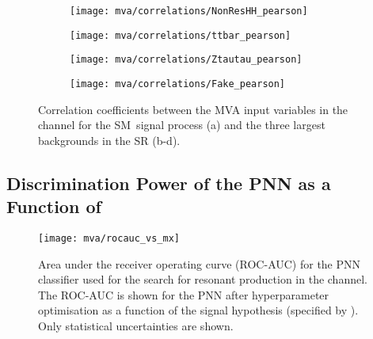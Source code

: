 \begin{figure}[htbp]
  \centering

  \begin{subfigure}[t]{.49\textwidth}
    \texttt{[image: mva/correlations/NonResHH\_pearson]}
  \end{subfigure}\hfill %
  \begin{subfigure}[t]{.49\textwidth}
    \texttt{[image: mva/correlations/ttbar\_pearson]}
  \end{subfigure}

  \begin{subfigure}[t]{.49\textwidth}
    \texttt{[image: mva/correlations/Ztautau\_pearson]}
  \end{subfigure}\hfill %
  \begin{subfigure}[t]{.49\textwidth}
    \texttt{[image: mva/correlations/Fake\_pearson]}
  \end{subfigure}

  \caption[Correlation coefficients between the MVA input variables in the
  \hadhad channel.]{Correlation coefficients between the MVA input variables in
    the \hadhad channel for the SM~\HH signal process (a) and the three largest
    backgrounds in the \hadhad SR (b-d).}%
  \label{fig:mva_input_correlations}
\end{figure}


\clearpage
\subsection{Discrimination Power of the PNN as a Function of \mX}%
\label{app:pnn_rocauc_vs_mx}

\begin{figure}[htbp]
  \centering

  \texttt{[image: mva/rocauc\_vs\_mx]}

  \caption{Area under the receiver operating curve (ROC-AUC) for the
    PNN classifier used for the search for resonant \HH production in
    the \hadhad channel. The ROC-AUC is shown for the PNN after
    hyperparameter optimisation as a function of the signal hypothesis
    (specified by \mX). Only statistical uncertainties are shown.}%
  \label{fig:pnn_rocauc_vs_mx}
\end{figure}


